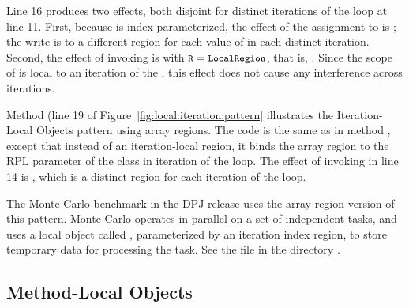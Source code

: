 Line 16 produces two effects, both disjoint for distinct iterations of
the  loop at line 11.  First, because  is
index-parameterized, the effect of the assignment to 
is ; the write is to a different region for each value
of  in each distinct iteration.  Second, the effect of invoking
 is  with $\mbox{\small{\texttt{R}}}=\mbox{\small{\texttt{LocalRegion}}}$,
that is, .  Since the scope of
 is local to an iteration of the , this
effect does not cause any interference across 
iterations.


 Method
 (line 19 of
Figure~\ref{fig:local:iteration:pattern} illustrates the
Iteration-Local Objects pattern using array regions.  The code is the
same as in method , except that instead of an
iteration-local region, it binds the array region \kwd{[i]} to the RPL
parameter of the  class in iteration  of the
 loop.  The effect of invoking  in line
14 is , which is a distinct region for each iteration
of the loop.

 The Monte Carlo benchmark in the DPJ
release uses the array region version of this pattern.  Monte Carlo
operates in parallel on a set of independent tasks, and uses a local
object called , parameterized by an iteration index
region, to store temporary data for processing the task.  See the file
 in the directory
.  


\begin{comment}
\subsubsection{Algorithm Example:  Monte Carlo Path Computation%
\label{sec:local:iteration:mc}}

TODO

\begin{figure}
\begin{numbereddpjlisting}
TODO
\end{numbereddpjlisting}
\caption{Iteration-Local Objects in the Monte Carlo path computation.}
\label{fig:local:iteration:mc}
\end{figure}
\end{comment}

\subsection{Method-Local Objects%
\label{sec:local:method}}

